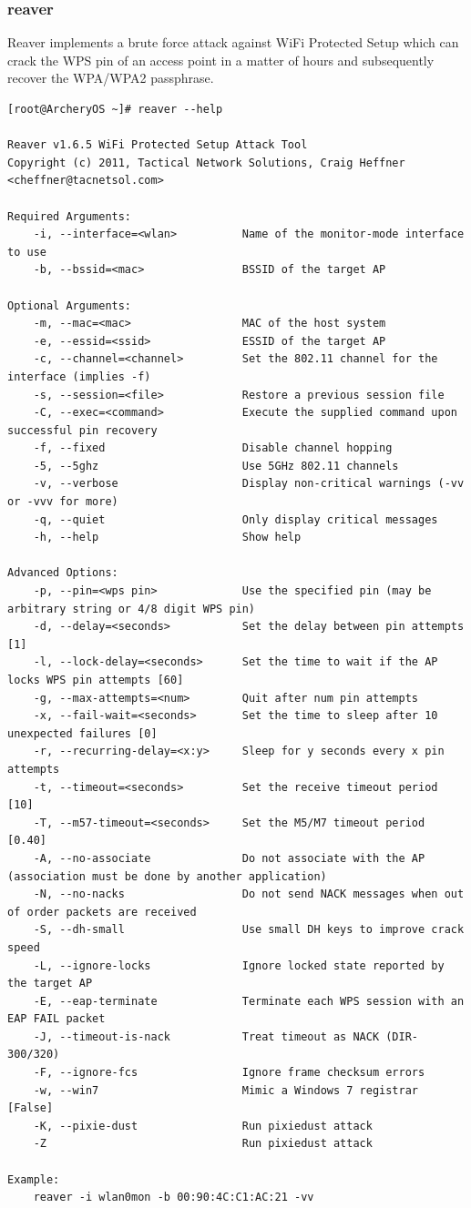 \documentclass{article}
\begin{document}
\subsubsection{reaver}
Reaver  implements a brute force attack against WiFi Protected Setup which can crack the WPS pin of an access point in a matter of hours and subsequently recover the WPA/WPA2 passphrase.
\begin{lstlisting}
[root@ArcheryOS ~]# reaver --help

Reaver v1.6.5 WiFi Protected Setup Attack Tool
Copyright (c) 2011, Tactical Network Solutions, Craig Heffner <cheffner@tacnetsol.com>

Required Arguments:
	-i, --interface=<wlan>          Name of the monitor-mode interface to use
	-b, --bssid=<mac>               BSSID of the target AP

Optional Arguments:
	-m, --mac=<mac>                 MAC of the host system
	-e, --essid=<ssid>              ESSID of the target AP
	-c, --channel=<channel>         Set the 802.11 channel for the interface (implies -f)
	-s, --session=<file>            Restore a previous session file
	-C, --exec=<command>            Execute the supplied command upon successful pin recovery
	-f, --fixed                     Disable channel hopping
	-5, --5ghz                      Use 5GHz 802.11 channels
	-v, --verbose                   Display non-critical warnings (-vv or -vvv for more)
	-q, --quiet                     Only display critical messages
	-h, --help                      Show help

Advanced Options:
	-p, --pin=<wps pin>             Use the specified pin (may be arbitrary string or 4/8 digit WPS pin)
	-d, --delay=<seconds>           Set the delay between pin attempts [1]
	-l, --lock-delay=<seconds>      Set the time to wait if the AP locks WPS pin attempts [60]
	-g, --max-attempts=<num>        Quit after num pin attempts
	-x, --fail-wait=<seconds>       Set the time to sleep after 10 unexpected failures [0]
	-r, --recurring-delay=<x:y>     Sleep for y seconds every x pin attempts
	-t, --timeout=<seconds>         Set the receive timeout period [10]
	-T, --m57-timeout=<seconds>     Set the M5/M7 timeout period [0.40]
	-A, --no-associate              Do not associate with the AP (association must be done by another application)
	-N, --no-nacks                  Do not send NACK messages when out of order packets are received
	-S, --dh-small                  Use small DH keys to improve crack speed
	-L, --ignore-locks              Ignore locked state reported by the target AP
	-E, --eap-terminate             Terminate each WPS session with an EAP FAIL packet
	-J, --timeout-is-nack           Treat timeout as NACK (DIR-300/320)
	-F, --ignore-fcs                Ignore frame checksum errors
	-w, --win7                      Mimic a Windows 7 registrar [False]
	-K, --pixie-dust                Run pixiedust attack
	-Z                              Run pixiedust attack

Example:
	reaver -i wlan0mon -b 00:90:4C:C1:AC:21 -vv
\end{lstlisting}
\end{document}
